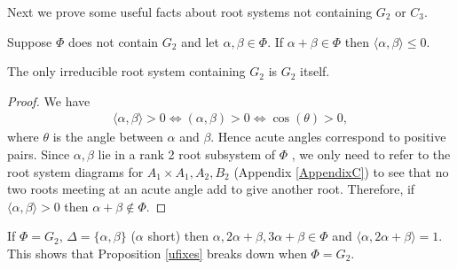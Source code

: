 Next we prove some useful facts about root systems not containing $G_2$ or $C_3$.

\begin{proposition} \label{ufixes} Suppose $\Phi$ does not contain $G_2$ and let $\alpha,\beta\in\Phi$. If $\alpha + \beta \in \Phi$ then $\langle \alpha, \beta \rangle \leq 0$.
\end{proposition}
\begin{remark}\label{g2rem}
	The only irreducible root system containing $G_2$ is $G_2$ itself.
\end{remark}
\begin{proof}We have
\begin{align*}
\langle \alpha, \beta \rangle > 0 \Leftrightarrow (\alpha, \beta) >0 \Leftrightarrow \cos(\theta) > 0,
\end{align*}
where $\theta$ is the angle between $\alpha$ and $\beta$. Hence acute angles correspond to positive pairs. Since $\alpha,\beta$ lie in a rank 2 root subsystem of $\Phi$ \cite[A.4]{humphreys1975linear}, we only need to refer to the root system diagrams for $A_1\times A_1, A_2, B_2$ (Appendix \ref{AppendixC}) to see that no two roots meeting at an acute angle add to give another root. Therefore, if $\langle \alpha, \beta \rangle > 0$ then $\alpha + \beta \notin \Phi$.
\end{proof}

\begin{remark}\label{g2counter}
If $\Phi = G_2$, $\Delta = \{\alpha, \beta\}$ ($\alpha$ short) then $\alpha, 2\alpha + \beta, 3\alpha + \beta \in \Phi$ and $\langle \alpha, 2\alpha + \beta \rangle = 1$. This shows that Proposition \ref{ufixes} breaks down when $\Phi = G_2$.
\end{remark}


